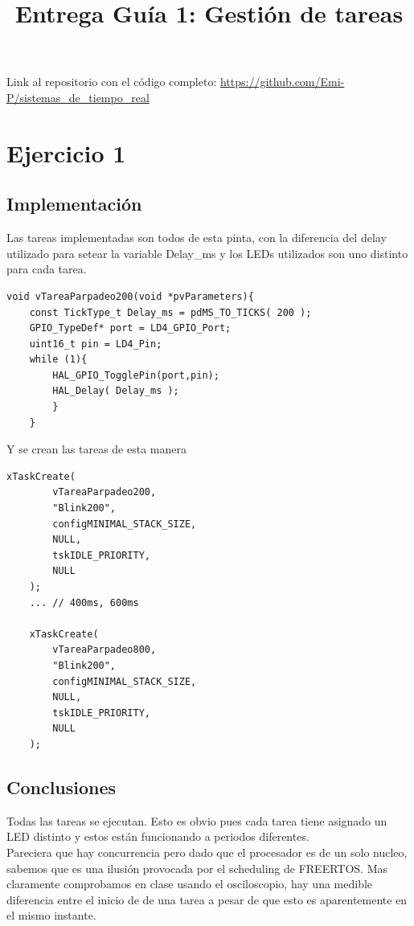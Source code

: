\documentclass[12pt]{article}
\begin{document}
\title{Entrega Guía 1: Gestión de tareas}
\begin{titlepage}
    \maketitle
    Link al repositorio con el código completo:
    \href{https://github.com/Emi-P/sistemas_de_tiempo_real}{https://github.com/Emi-P/sistemas\_de\_tiempo\_real}
\end{titlepage}

\section{Ejercicio 1}
\subsection{Implementación}
Las tareas implementadas son todos de esta pinta,
con la diferencia del delay utilizado para setear
la variable Delay\_ms y los LEDs utilizados son uno
distinto para cada tarea.
\begin{lstlisting}[style=CStyle]
    void vTareaParpadeo200(void *pvParameters){
	const TickType_t Delay_ms = pdMS_TO_TICKS( 200 );
	GPIO_TypeDef* port = LD4_GPIO_Port;
	uint16_t pin = LD4_Pin;
	while (1){
		HAL_GPIO_TogglePin(port,pin);
		HAL_Delay( Delay_ms );
        }
    }
\end{lstlisting}
Y se crean las tareas de esta manera
\begin{lstlisting}[style=CStyle]
    xTaskCreate(
        vTareaParpadeo200,
        "Blink200",
        configMINIMAL_STACK_SIZE,
        NULL,
        tskIDLE_PRIORITY,
        NULL
    );
    ... // 400ms, 600ms

    xTaskCreate(
        vTareaParpadeo800,
        "Blink200",
        configMINIMAL_STACK_SIZE,
        NULL,
        tskIDLE_PRIORITY,
        NULL
    );
\end{lstlisting}

\subsection{Conclusiones}
Todas las tareas se ejecutan. Esto es obvio pues
cada tarea tiene asignado un LED distinto y estos
están funcionando a periodos diferentes. \\
Pareciera que hay concurrencia pero dado que el 
procesador es de un solo nucleo, sabemos que 
es una ilusión provocada por el scheduling de FREERTOS. Mas claramente
comprobamos en clase usando el osciloscopio,
hay una medible diferencia entre el inicio de de una tarea a pesar de
que esto es aparentemente en el mismo instante.
\end{document}

